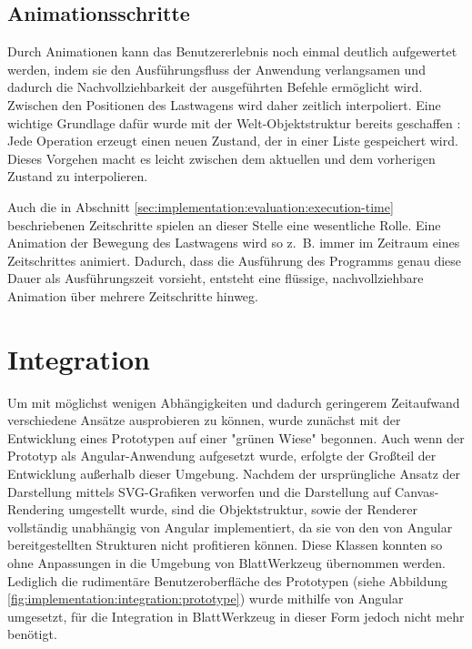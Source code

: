 \subsection{Animationsschritte}
\label{sec:implementation:rendering:animation}

Durch Animationen kann das Benutzererlebnis noch einmal deutlich aufgewertet werden, indem sie den Ausführungsfluss der Anwendung verlangsamen und dadurch die Nachvollziehbarkeit der ausgeführten Befehle ermöglicht wird. Zwischen den Positionen des Lastwagens wird daher zeitlich interpoliert. Eine wichtige Grundlage dafür wurde mit der Welt-Ob\-jekt\-struk\-tur bereits geschaffen : Jede Operation erzeugt einen neuen Zustand, der in einer Liste gespeichert wird. Dieses Vorgehen macht es leicht zwischen dem aktuellen und dem vorherigen Zustand zu interpolieren.

Auch die in Abschnitt \ref{sec:implementation:evaluation:execution-time} beschriebenen Zeitschritte spielen an dieser Stelle eine wesentliche Rolle. Eine Animation der Bewegung des Lastwagens wird so z.~B. immer im Zeitraum eines Zeitschrittes animiert. Dadurch, dass die Ausführung des Programms genau diese Dauer als Ausführungszeit vorsieht, entsteht eine flüssige, nachvollziehbare Animation über mehrere Zeitschritte hinweg.

\section[Integration]{Integration\protect\footnotemark}
\label{sec:implementation:integration}


Um mit möglichst wenigen Abhängigkeiten und dadurch geringerem Zeitaufwand verschiedene Ansätze ausprobieren zu können, wurde zunächst mit der Entwicklung eines Prototypen auf einer "grünen Wiese" begonnen. Auch wenn der Prototyp als Angular-An\-wen\-dung aufgesetzt wurde, erfolgte der Großteil der Entwicklung außerhalb dieser Umgebung. Nachdem der ursprüngliche Ansatz der Darstellung mittels SVG-Grafiken verworfen und die Darstellung auf Can\-vas-Ren\-der\-ing umgestellt wurde, sind die Objektstruktur, sowie der Renderer vollständig unabhängig von Angular implementiert, da sie von den von Angular bereitgestellten Strukturen nicht profitieren können. Diese Klassen konnten so ohne Anpassungen in die Umgebung von BlattWerkzeug übernommen werden. Lediglich die rudimentäre Benutzeroberfläche des Prototypen (siehe Abbildung \ref{fig:implementation:integration:prototype}) wurde mithilfe von Angular umgesetzt, für die Integration in BlattWerkzeug in dieser Form jedoch nicht mehr benötigt.

